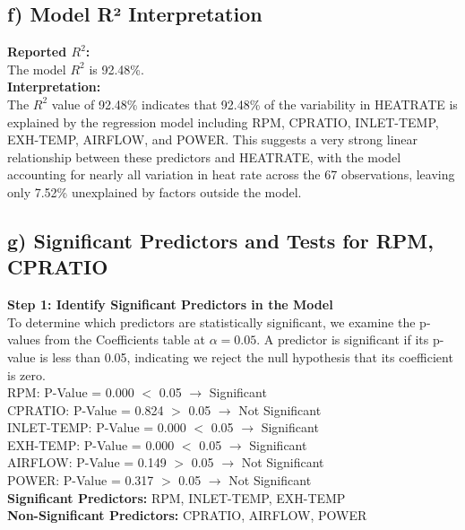 \documentclass{article}
\begin{document}
\newpage


\subsection*{f) Model R² Interpretation}
\textbf{Reported \( R^2 \):} \\
The model \( R^2 \) is 92.48\%. \\
\textbf{Interpretation:} \\
The \( R^2 \) value of 92.48\% indicates that 92.48\% of the variability in HEATRATE  is explained by the regression model including RPM, CPRATIO, INLET-TEMP, EXH-TEMP, AIRFLOW, and POWER. This suggests a very strong linear relationship between these predictors and HEATRATE, with the model accounting for nearly all variation in heat rate across the 67 observations, leaving only 7.52\% unexplained by factors outside the model.


\newpage
\subsection*{g) Significant Predictors and Tests for RPM, CPRATIO}
\textbf{Step 1: Identify Significant Predictors in the Model} \\
To determine which predictors are statistically significant, we examine the p-values from the Coefficients table at \( \alpha = 0.05 \). A predictor is significant if its p-value is less than 0.05, indicating we reject the null hypothesis that its coefficient is zero. \\
RPM: P-Value = 0.000 $<$ 0.05 \(\rightarrow\) Significant \\
CPRATIO: P-Value = 0.824 $>$ 0.05 \(\rightarrow\) Not Significant \\
INLET-TEMP: P-Value = 0.000 $<$ 0.05 \(\rightarrow\) Significant \\
EXH-TEMP: P-Value = 0.000 $<$ 0.05 \(\rightarrow\) Significant \\
AIRFLOW: P-Value = 0.149 $>$ 0.05 \(\rightarrow\) Not Significant \\
POWER: P-Value = 0.317 $>$ 0.05 \(\rightarrow\) Not Significant \\
\textbf{Significant Predictors:} RPM, INLET-TEMP, EXH-TEMP \\
\textbf{Non-Significant Predictors:} CPRATIO, AIRFLOW, POWER
\end{document}
